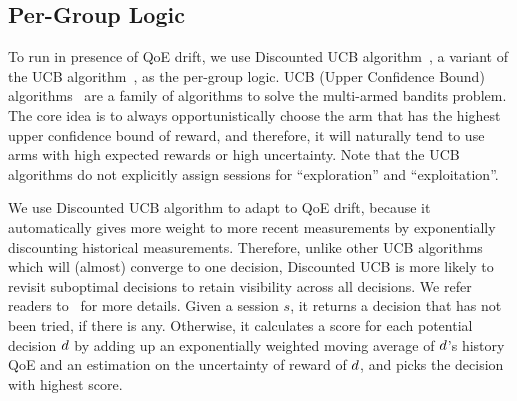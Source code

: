 \subsection{Per-Group \mab Logic}
\label{subsec:per-group}

To run \mab in presence of QoE drift, we use Discounted UCB
algorithm~\cite{discounteducb}, a variant of the UCB algorithm~\cite{ucb1}, as the
per-group \mab logic.  UCB (Upper Confidence Bound) algorithms~\cite{ucb1} are a
family of algorithms to solve the multi-armed bandits problem.  The core
idea is to always opportunistically choose the arm that has the highest
upper confidence bound of reward, and therefore, it will naturally tend to
use arms with high expected rewards or high
uncertainty. Note that the UCB algorithms do not explicitly assign sessions 
 for ``exploration'' and ``exploitation''.

We use Discounted UCB algorithm to adapt to QoE drift, because it automatically
gives more weight to more recent measurements by exponentially discounting
historical measurements.  Therefore, unlike other UCB algorithms which will
(almost) converge to one decision, Discounted UCB is more likely to revisit
suboptimal decisions to retain visibility across all decisions.
We refer readers to~\cite{discounteducb} for more details.
Given a session $s$, it
returns a decision that has not been tried, if there is any.  Otherwise, it
calculates a score for each potential decision $d$ by adding up an
exponentially weighted moving average of $d$'s history QoE and an
estimation on the uncertainty of reward of $d$, and picks
the decision with highest score.







